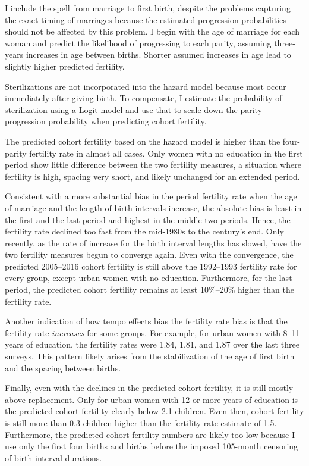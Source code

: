\documentclass[12pt,letterpaper]{article}
\begin{document}
I include the spell from marriage to first birth, despite the problems capturing the exact 
timing of marriages because the estimated progression probabilities should not be affected 
by this problem. 
I begin with the age of marriage for each woman and predict the likelihood of progressing 
to each parity, assuming three-years increases in age between births. 
Shorter assumed increases in age lead to slightly higher predicted fertility.

Sterilizations are not incorporated into the hazard model because most occur
immediately after giving birth. 
To compensate, I estimate the probability of sterilization using a Logit model and use 
that to scale down the parity progression probability when predicting cohort fertility.

The predicted cohort fertility based on the hazard model is higher than the four-parity 
fertility rate in almost all cases. 
Only women with no education in the first period show little difference between the two 
fertility measures, a situation where fertility is high, spacing very short, and likely 
unchanged for an extended period.

Consistent with a more substantial bias in the period fertility rate when the age of marriage 
and the length of birth intervals increase, the absolute bias is least in the first 
and the last period and highest in the middle two periods.
Hence, the fertility rate declined too fast from the mid-1980s to the century's end.
Only recently, as the rate of increase for the birth interval lengths has slowed, have the 
two fertility measures begun to converge again.
Even with the convergence, the predicted 2005--2016 cohort fertility is still above the 
1992--1993 fertility rate for every group, except urban women with no education. 
Furthermore, for the last period, the predicted cohort fertility remains at least 
10\%--20\% higher than the fertility rate.

Another indication of how tempo effects bias the fertility rate bias is that the
fertility rate \emph{increases} for some groups.
For example, for urban women with 8--11 years of education, the fertility
rates were 1.84, 1.81, and 1.87 over the last three surveys.
This pattern likely arises from the stabilization of the age of first birth and the 
spacing between births.

Finally, even with the declines in the predicted cohort fertility, it is still mostly 
above replacement.
Only for urban women with 12 or more years of education is the predicted cohort
fertility clearly below 2.1 children.
Even then, cohort fertility is still more than 0.3 children higher than 
the fertility rate estimate of 1.5.
Furthermore, the predicted cohort fertility numbers are likely too low because I use only
the first four births and births before the imposed 105-month censoring of birth interval
durations.
\end{document}
